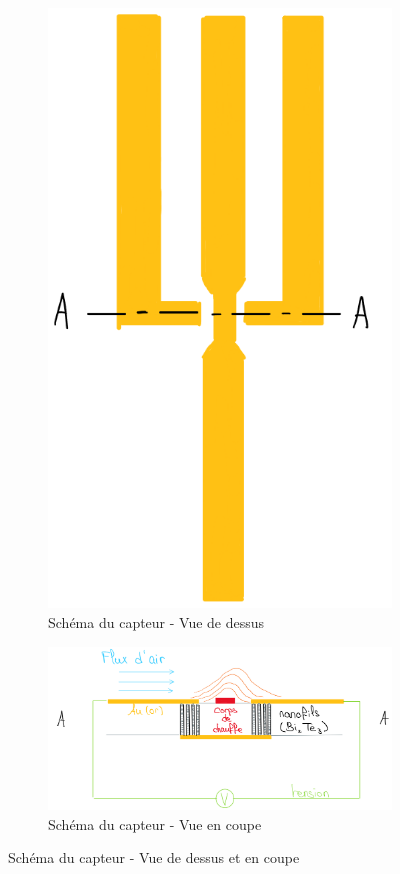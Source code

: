\begin{figure}[H]
    \hspace{-0.7cm}
    \begin{subfigure}{0.4\textwidth}
        \includegraphics[scale = 0.3]{assets/figures/schema_capteur_vue_dessus.png}
        \caption{Schéma du capteur - Vue de dessus}
        \label{fig:schema_dessus}
    \end{subfigure}
    \begin{subfigure}{0.4\textwidth}
        \includegraphics[scale = 0.4]{images/CapteurFUN.png}
        \caption{Schéma du capteur - Vue en coupe}
        \label{fig:schema_coupe}
    \end{subfigure}
    \caption{Schéma du capteur - Vue de dessus et en coupe}
\end{figure}
